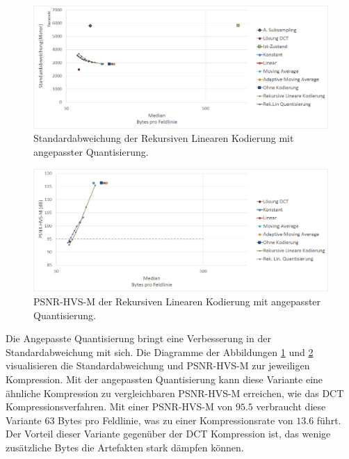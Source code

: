 \begin{figure}[!htbp]
	\center
	\includegraphics[width=1\textwidth,keepaspectratio]{./pictures/resultate/loesung2/variante3/resultate.png}
		
		\caption{Standardabweichung der Rekursiven Linearen Kodierung mit angepasster Quantisierung.}
		\label{resultate:loesung2:adaptive:median:quant}
\end{figure}
\begin{figure}[!htbp]
\center
	\includegraphics[width=1\textwidth,keepaspectratio]{./pictures/resultate/loesung2/variante3/resultate_psnr.png}
	
	\caption{PSNR-HVS-M der Rekursiven Linearen Kodierung mit angepasster Quantisierung.}
	\label{resultate:loesung2:adaptive:median:quant_psnr}
\end{figure}
Die Angepasste Quantisierung bringt eine Verbesserung in der Standardabweichung mit sich. Die Diagramme der Abbildungen \ref{resultate:loesung2:adaptive:median:quant} und \ref{resultate:loesung2:adaptive:median:quant_psnr} visualisieren die Standardabweichung und PSNR-HVS-M zur jeweiligen Kompression. Mit der angepassten Quantisierung kann diese Variante eine ähnliche Kompression zu vergleichbaren PSNR-HVS-M erreichen, wie das DCT Kompressionsverfahren. Mit einer PSNR-HVS-M von $95.5$ verbraucht diese Variante $63$ Bytes pro Feldlinie, was zu einer Kompressionsrate von $13.6$ führt. Der Vorteil dieser Variante gegenüber der DCT Kompression ist, das wenige zusätzliche Bytes die Artefakten stark dämpfen können. 

